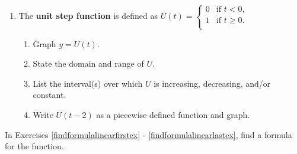 \documentclass{ximera}
\begin{document}
\begin{enumerate}
\setcounter{enumi}{\value{HW}}

\item  \label{unitstepexercise} The \textbf{unit step function} is defined as $U(t) = \begin{cases}
    0 &  \text{if $t<0$, } \\
    1  & \text{if $t \geq 0$.} \\
   \end{cases}$

\begin{enumerate}

\item  Graph $y = U(t)$.

\item  State the domain and range of $U$.

\item  List the interval(s) over which $U$ is increasing, decreasing, and/or constant.

\item  Write $U(t-2)$ as a piecewise defined function and graph.

\end{enumerate}


\setcounter{HW}{\value{enumi}}
\end{enumerate}


In Exercises \ref{findformulalinearfirstex} - \ref{findformulalinearlastex}, find a formula for the function.
\end{document}

